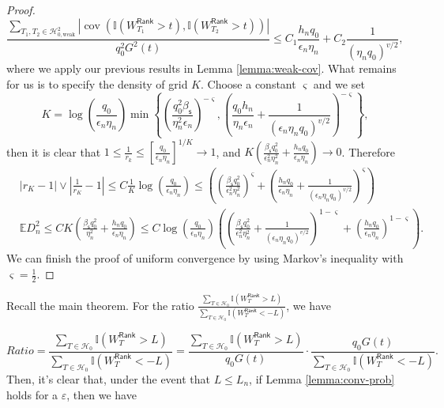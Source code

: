 \documentclass[12pt]{article}
\newcommand{\abs}[1]{\left\lvert#1\right\rvert}
\newcommand{\E}{\mathbb{E}}
\newcommand{\cH}{\mathcal{H}}
\newcommand{\bbI}{\mathbb{I}}
\theoremstyle{plain}
\begin{document}
\begin{proof}
\begin{equation*}
    \frac{\sum\limits_{T_1,T_2\in\cH^2_{0,\text{weak}} } \abs{\operatorname{cov}(\bbI(W_{T_1}^{\mathsf{Rank} }>t),\bbI(W_{T_2}^{\mathsf{Rank} }>t)) }}{q_0^2 G^2(t)}\le C_1 \frac{h_n q_0}{\epsilon_n \eta_n }+C_2 \frac{1}{ \left(\eta_n q_0\right)^{v/2} },
\end{equation*}
 where we apply our previous results in Lemma \ref{lemma:weak-cov}. What remains for us is to specify the density of grid $K$. Choose a constant $\varsigma$ and we set
 $$K= \log(\frac{q_0 }{\epsilon_n \eta_n}) \min \left\{ \left(\frac{ q_0^2 \beta_{\mathsf{s}} }{ \eta_n^2 \epsilon_n  }\right)^{-\varsigma} , \left( \frac{q_0 h_n}{\eta_n\epsilon_n}+\frac{1}{ \left(\epsilon_n\eta_n q_0\right)^{v/2} } \right)^{-\varsigma} \right\}  ,$$ 
 then it is clear that $1\le\frac{1}{r_k}\le \left[ \frac{q_0}{\epsilon_n \eta_n} \right]^{1/K}\to 1$, and $ K (\frac{\beta_{\mathsf{s}}q_0^2 }{ \epsilon_n^2\eta_n^2} + \frac{h_n q_0}{\epsilon_n \eta_n })\to 0$. Therefore 
 \begin{equation*}
\begin{aligned}
      &\abs{r_K-1}\vee\abs{\frac{1}{r_K}-1 } \le C \frac{1}{K}\log(\frac{q_0 }{\epsilon_n \eta_n}) \le  \left( \left(\frac{\beta_{\mathsf{s}} q_0^2 }{ \epsilon_n^2\eta_n^2}\right)^{\varsigma} + \left(\frac{h_n q_0}{\epsilon_n \eta_n} +\frac{1}{ \left(\epsilon_n\eta_n q_0\right)^{v/2} }\right)^{\varsigma}\right) \\
    &\E D^2_n  \le C K \left(\frac{\beta_{\mathsf{s}}q_0^2 }{ \eta_n^2} + \frac{h_n q_0}{\epsilon_n \eta_n} \right)\le C \log(\frac{q_0 }{\epsilon_n \eta_n}) \left( \left(\frac{\beta_{\mathsf{s}} q_0^2 }{ \epsilon_n^2\eta_n^2}+\frac{1}{ \left(\epsilon_n\eta_n q_0\right)^{v/2} }\right)^{1-\varsigma} + \left(\frac{h_n q_0}{\epsilon_n \eta_n} \right)^{1-\varsigma}\right).
\end{aligned}
 \end{equation*}
We can finish the proof of uniform convergence by using Markov's inequality with $\varsigma=\frac{1}{2}$.
\end{proof}

Recall the main theorem. For the ratio $\frac{\sum_{T\in \cH_0  } \bbI(W_T^{\mathsf{Rank} } >L ) }{ \sum_{T\in \cH_0  } \bbI(W_T^{\mathsf{Rank} } <-L )}$, we have

\begin{equation*}
    Ratio=\frac{\sum_{T\in \cH_0  } \bbI(W_T^{\mathsf{Rank} } >L ) }{ \sum_{T\in \cH_0  } \bbI(W_T^{\mathsf{Rank} } <-L )} =  \frac{\sum_{T\in \cH_0  } \bbI(W_T^{\mathsf{Rank} } >L ) }{ q_0 G(t) } \cdot \frac{q_0 G(t) }{  \sum_{T\in \cH_0  } \bbI(W_T^{\mathsf{Rank} } <-L ) }.
\end{equation*}
Then, it's clear that, under the event that $L\le L_n$, if Lemma \ref{lemma:conv-prob} holds for a $\varepsilon$, then we have
\end{document}
